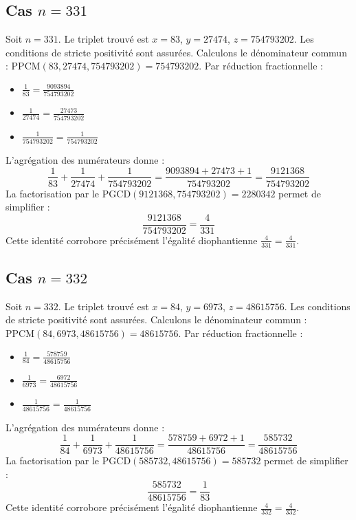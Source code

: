 \documentclass[11pt,a4paper]{article}
\begin{document}
\subsection{Cas $n = 331$}
Soit $n = 331$. Le triplet trouvé est $x = 83$, $y = 27474$, $z = 754793202$.
Les conditions de stricte positivité sont assurées.
Calculons le dénominateur commun : $\text{PPCM}(83, 27474, 754793202) = 754793202$.
Par réduction fractionnelle :
\begin{itemize}
    \item $\frac{1}{83} = \frac{9093894}{754793202}$
    \item $\frac{1}{27474} = \frac{27473}{754793202}$
    \item $\frac{1}{754793202} = \frac{1}{754793202}$
\end{itemize}
L'agrégation des numérateurs donne :
$$ \frac{1}{83} + \frac{1}{27474} + \frac{1}{754793202} = \frac{9093894 + 27473 + 1}{754793202} = \frac{9121368}{754793202} $$
La factorisation par le $\text{PGCD}(9121368, 754793202) = 2280342$ permet de simplifier :
$$ \frac{9121368}{754793202} = \frac{4}{331} $$
Cette identité corrobore précisément l'égalité diophantienne $\frac{4}{331} = \frac{4}{331}$.

\subsection{Cas $n = 332$}
Soit $n = 332$. Le triplet trouvé est $x = 84$, $y = 6973$, $z = 48615756$.
Les conditions de stricte positivité sont assurées.
Calculons le dénominateur commun : $\text{PPCM}(84, 6973, 48615756) = 48615756$.
Par réduction fractionnelle :
\begin{itemize}
    \item $\frac{1}{84} = \frac{578759}{48615756}$
    \item $\frac{1}{6973} = \frac{6972}{48615756}$
    \item $\frac{1}{48615756} = \frac{1}{48615756}$
\end{itemize}
L'agrégation des numérateurs donne :
$$ \frac{1}{84} + \frac{1}{6973} + \frac{1}{48615756} = \frac{578759 + 6972 + 1}{48615756} = \frac{585732}{48615756} $$
La factorisation par le $\text{PGCD}(585732, 48615756) = 585732$ permet de simplifier :
$$ \frac{585732}{48615756} = \frac{1}{83} $$
Cette identité corrobore précisément l'égalité diophantienne $\frac{4}{332} = \frac{4}{332}$.
\end{document}
